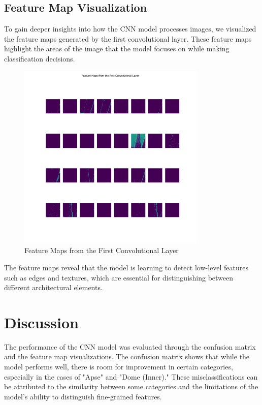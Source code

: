 \documentclass[12pt]{article}
\begin{document}
\subsection{Feature Map Visualization}
To gain deeper insights into how the CNN model processes images, we visualized the feature maps generated by the first convolutional layer. These feature maps highlight the areas of the image that the model focuses on while making classification decisions.

\begin{figure}[H]
    \centering
    \includegraphics[width=0.8\textwidth]{feature_maps_layer1.png}
    \caption{Feature Maps from the First Convolutional Layer}
\end{figure}

The feature maps reveal that the model is learning to detect low-level features such as edges and textures, which are essential for distinguishing between different architectural elements.

\section{Discussion}
The performance of the CNN model was evaluated through the confusion matrix and the feature map visualizations. The confusion matrix shows that while the model performs well, there is room for improvement in certain categories, especially in the cases of "Apse" and "Dome (Inner)." These misclassifications can be attributed to the similarity between some categories and the limitations of the model's ability to distinguish fine-grained features.
\end{document}
